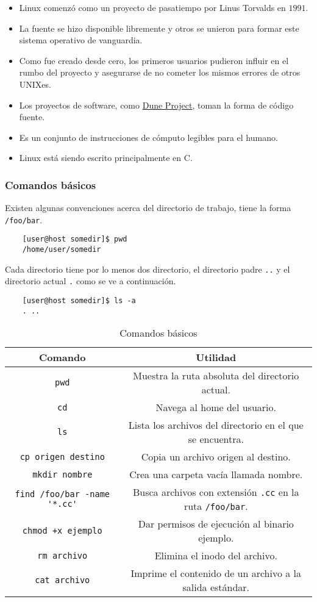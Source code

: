 
\begin{frame}
	\begin{itemize}
		\item
		      Linux comenzó como un proyecto de pasatiempo por Linus Torvalds en $1991$.
		\item
		      La fuente se hizo disponible libremente y otros se unieron para formar este sistema operativo de vanguardia.
		\item
		      Como fue creado desde cero, los primeros usuarios pudieron influir en el rumbo del proyecto y asegurarse de no cometer los mismos errores de otros UNIXes.
		\item
		      Los proyectos de software, como \href{https://dune-project.org}{Dune Project}, toman la forma de código fuente.
		\item
		Es un conjunto de instrucciones de cómputo legibles para el humano.
		\item Linux está siendo escrito principalmente en C.
	\end{itemize}
\end{frame}

\begin{frame}[fragile]
	\frametitle{Comandos básicos}

	Existen algunas convenciones acerca del directorio de trabajo, tiene la forma \lstinline|/foo/bar|.
	\begin{verbatim}
    [user@host somedir]$ pwd
    /home/user/somedir
    \end{verbatim}
	Cada directorio tiene por lo menos dos directorio, el directorio padre \lstinline|..| y el directorio actual \lstinline|.| como se ve a continuación.
	\begin{verbatim}
    [user@host somedir]$ ls -a
    . ..
    \end{verbatim}

	\begin{table}[ht!]
		\caption{Comandos básicos}
		\centering\footnotesize
		\begin{tabular}{cc}
			\toprule
			Comando                 & Utilidad
			\tabularnewline
			\midrule
			\lstinline|pwd|  & Muestra la ruta absoluta del directorio actual.
			\tabularnewline
			\lstinline|cd|  & Navega al home del usuario.
			\tabularnewline
			\lstinline|ls|  & Lista los archivos del directorio en el que se encuentra.
			\tabularnewline
			\lstinline|cp origen destino|  & Copia un archivo origen al destino.
			\tabularnewline
			\lstinline|mkdir nombre|  & Crea una carpeta vacía llamada nombre.
			\tabularnewline
			\lstinline|find /foo/bar -name '*.cc'|  & Busca archivos con extensión \lstinline|.cc| en la ruta \lstinline|/foo/bar|.
			\tabularnewline
			\lstinline|chmod +x ejemplo| & Dar permisos de ejecución al binario ejemplo.
			\tabularnewline
			\lstinline|rm archivo| & Elimina el inodo del archivo.
			\tabularnewline
			\lstinline|cat archivo| & Imprime el contenido de un archivo a la salida estándar.
			\tabularnewline
			\bottomrule
		\end{tabular}
	\end{table}

\end{frame}

